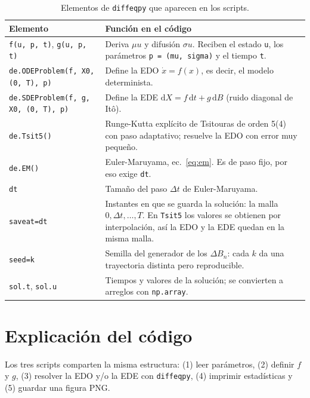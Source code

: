 \documentclass[11pt,a4paper]{article}
\newcommand{\dd}{\mathrm{d}}
\begin{document}
\begin{table}[H]
    \centering
    \caption{Elementos de \texttt{diffeqpy} que aparecen en los scripts.}
    \label{tab:diffeqpy}
    \begin{tabular}{p{4.2cm}p{10.3cm}}
        \toprule
        Elemento & Función en el código \\
        \midrule
        \texttt{f(u, p, t)}, \texttt{g(u, p, t)} & Deriva $\mu u$ y difusión $\sigma u$. Reciben el estado \texttt{u}, los parámetros \texttt{p = (mu, sigma)} y el tiempo \texttt{t}. \\
        \texttt{de.ODEProblem(f, X0, (0, T), p)} & Define la EDO $\dot x = f(x)$, es decir, el modelo determinista. \\
        \texttt{de.SDEProblem(f, g, X0, (0, T), p)} & Define la EDE $\dd X = f\,\dd t + g\,\dd B$ (ruido diagonal de Itô). \\
        \texttt{de.Tsit5()} & Runge-Kutta explícito de Tsitouras de orden 5(4) con paso adaptativo; resuelve la EDO con error muy pequeño. \\
        \texttt{de.EM()} & Euler-Maruyama, ec.~\eqref{eq:em}. Es de paso fijo, por eso exige \texttt{dt}. \\
        \texttt{dt} & Tamaño del paso $\Delta t$ de Euler-Maruyama. \\
        \texttt{saveat=dt} & Instantes en que se guarda la solución: la malla $0, \Delta t, \ldots, T$. En \texttt{Tsit5} los valores se obtienen por interpolación, así la EDO y la EDE quedan en la misma malla. \\
        \texttt{seed=k} & Semilla del generador de los $\Delta B_n$: cada $k$ da una trayectoria distinta pero reproducible. \\
        \texttt{sol.t}, \texttt{sol.u} & Tiempos y valores de la solución; se convierten a arreglos con \texttt{np.array}. \\
        \bottomrule
    \end{tabular}
\end{table}

\section{Explicación del código}

Los tres scripts comparten la misma estructura: (1) leer parámetros, (2) definir $f$ y $g$, (3) resolver la EDO y/o la EDE con \texttt{diffeqpy}, (4) imprimir estadísticas y (5) guardar una figura PNG.
\end{document}
